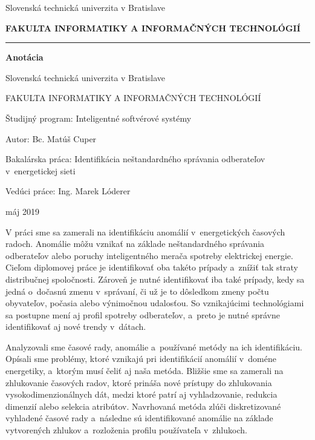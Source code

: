 \documentclass[a4paper,twoside,slovak,12pt,appendix]{article}
\begin{document}


\begin{titlepage}
\begin{center}
  {\small Slovenská technická univerzita v Bratislave \par}
  {\small \textbf{FAKULTA INFORMATIKY A INFORMAČNÝCH TECHNOLÓGIÍ}}
  \rule{\textwidth}{1pt}

  \vspace*{1.5cm}
  \begin{Large}
    \textbf{Anotácia} \par
  \end{Large}
\end{center}
{Slovenská technická univerzita v Bratislave \par}
{FAKULTA INFORMATIKY A INFORMAČNÝCH TECHNOLÓGIÍ \par}
{Študijný program: Inteligentné softvérové systémy \par}
{Autor: Bc. Matúš Cuper \par}
{Bakalárska práca: Identifikácia neštandardného správania odberateľov v~energetickej sieti \par}
{Vedúci práce: Ing. Marek Lóderer \par}
{máj 2019 \par}
\bigskip
V práci sme sa zamerali na identifikáciu anomálií v~energetických časových
radoch. Anomálie môžu vznikať na základe neštandardného správania odberateľov
alebo poruchy inteligentného merača spotreby elektrickej energie. Cieľom
diplomovej práce je identifikovať oba takéto prípady a~znížiť tak straty
distribučnej spoločnosti. Zároveň je nutné identifikovať iba také prípady, kedy
sa jedná o~dočasnú zmenu v~správaní, či už je to dôsledkom zmeny počtu
obyvateľov, počasia alebo výnimočnou udalosťou. So vznikajúcimi technológiami
sa postupne mení aj profil spotreby odberateľov, a~preto je nutné správne
identifikovať aj nové trendy v~dátach.

Analyzovali sme časové rady, anomálie a~používané metódy na ich identifikáciu.
Opísali sme problémy, ktoré vznikajú pri identifikácií anomálií v~doméne
energetiky, a~ktorým musí čeliť aj naša metóda. Bližšie sme sa zamerali na
zhlukovanie časových radov, ktoré prináša nové prístupy do zhlukovania
vysokodimenzionálnych dát, medzi ktoré patrí aj vyhladzovanie, redukcia dimenzií
alebo selekcia atribútov. Navrhovaná metóda zlúči diskretizované vyhladené
časové rady a~následne sú identifikované anomálie na základe vytvorených zhlukov
a~rozloženia profilu používateľa v~zhlukoch.
\end{titlepage}
\newpage\null\thispagestyle{empty}\newpage
\end{document}
